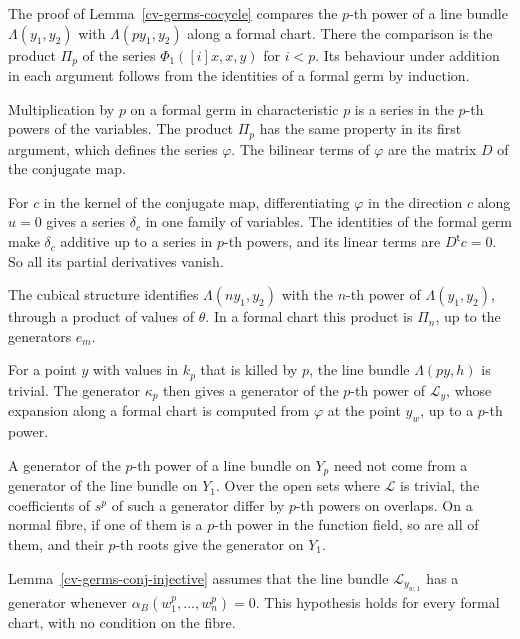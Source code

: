 The proof of Lemma~\ref{cv-germs-cocycle} compares the $p$-th power of a line bundle $\Lambda(y_1,y_2)$
with $\Lambda(py_1,y_2)$ along a formal chart. There the comparison is the product $\Pi_p$ of the series
$\Phi_1([i]x,x,y)$ for $i<p$. Its behaviour under addition in each argument follows from the identities of a
formal germ by induction.

Multiplication by $p$ on a formal germ in characteristic $p$ is a series in the $p$-th powers of the
variables. The product $\Pi_p$ has the same property in its first argument, which defines the series
$\varphi$. The bilinear terms of $\varphi$ are the matrix $D$ of the conjugate map.

For $c$ in the kernel of the conjugate map, differentiating $\varphi$ in the direction $c$ along $u=0$ gives a
series $\delta_c$ in one family of variables. The identities of the formal germ make $\delta_c$ additive up to
a series in $p$-th powers, and its linear terms are $D^{\mathsf t}c=0$. So all its partial derivatives vanish.

The cubical structure identifies $\Lambda(ny_1,y_2)$ with the $n$-th power of $\Lambda(y_1,y_2)$, through a
product of values of $\theta$. In a formal chart this product is $\Pi_n$, up to the generators $e_m$.

For a point $y$ with values in $k_p$ that is killed by $p$, the line bundle $\Lambda(py,h)$ is trivial. The
generator $\kappa_p$ then gives a generator of the $p$-th power of $\mathcal L_y$, whose expansion along a
formal chart is computed from $\varphi$ at the point $y_w$, up to a $p$-th power.

A generator of the $p$-th power of a line bundle on $Y_p$ need not come from a generator of the line bundle
on $Y_1$. Over the open sets where $\mathcal L$ is trivial, the coefficients of $s^p$ of such a generator
differ by $p$-th powers on overlaps. On a normal fibre, if one of them is a $p$-th power in the function
field, so are all of them, and their $p$-th roots give the generator on $Y_1$.

Lemma~\ref{cv-germs-conj-injective} assumes that the line bundle $\mathcal L_{y_{w,1}}$ has a generator
whenever $\alpha_B(w_1^p,\dots,w_n^p)=0$. This hypothesis holds for every formal chart, with no condition
on the fibre.

